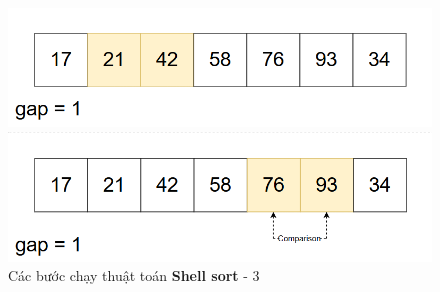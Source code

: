 \begin{figure}[H]
    \includegraphics[width=0.5\linewidth]{img/shell_sort/16.png}
    \vspace{0.15cm}

    \includegraphics[width=0.5\linewidth]{img/shell_sort/17.png}
    \caption{Các bước chạy thuật toán \textbf{Shell sort} - 3}
\end{figure}

